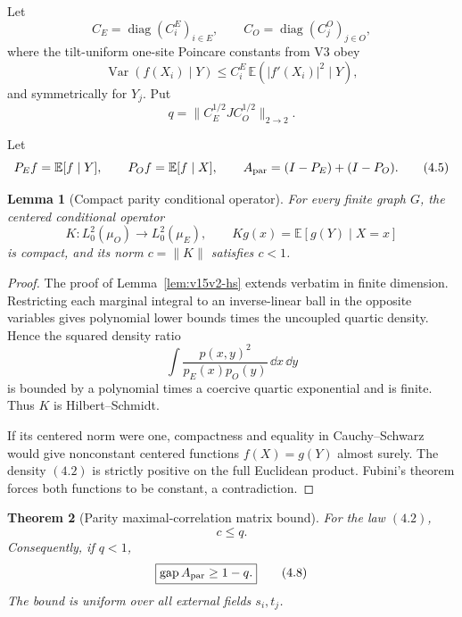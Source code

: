 \documentclass[11pt]{article}
\newtheorem{theorem}{Theorem}[section]
\newtheorem{lemma}[theorem]{Lemma}
\theoremstyle{remark}
\begin{document}
Let
\[
 C_E=\operatorname{diag}(C_i^E)_{i\in E},\qquad
 C_O=\operatorname{diag}(C_j^O)_{j\in O},                    \tag{4.3}
\]
where the tilt-uniform one-site Poincare constants from V3 obey
\[
 \operatorname{Var}(f(X_i)\mid Y)
 \le C_i^E\,\mathbb E(|f'(X_i)|^2\mid Y),
\]
and symmetrically for \(Y_j\).  Put
\[
 q=\|C_E^{1/2}JC_O^{1/2}\|_{2\to2}.                          \tag{4.4}
\]

Let
\[
 P_Ef=\mathbb E[f\mid Y],\qquad
 P_Of=\mathbb E[f\mid X],\qquad
 A_{\rm par}=(I-P_E)+(I-P_O).                                \tag{4.5}
\]

\begin{lemma}[Compact parity conditional operator]
\label{lem:v15v4-compact}
For every finite graph \(G\), the centered conditional operator
\[
 K:L^2_0(\mu_O)\longrightarrow L^2_0(\mu_E),
 \qquad
 Kg(x)=\mathbb E[g(Y)\mid X=x]
\]
is compact, and its norm \(c=\|K\|\) satisfies \(c<1\).
\end{lemma}

\begin{proof}
The proof of Lemma~\ref{lem:v15v2-hs} extends verbatim in finite
dimension.  Restricting each marginal integral to an inverse-linear
ball in the opposite variables gives polynomial lower bounds times
the uncoupled quartic density.  Hence the squared density ratio
\[
 \int
 \frac{p(x,y)^2}{p_E(x)p_O(y)}\,\dd x\,\dd y                 \tag{4.6}
\]
is bounded by a polynomial times a coercive quartic exponential
and is finite.  Thus \(K\) is Hilbert--Schmidt.

If its centered norm were one, compactness and equality in
Cauchy--Schwarz would give nonconstant centered functions
\(f(X)=g(Y)\) almost surely.  The density \((4.2)\) is strictly
positive on the full Euclidean product.  Fubini's theorem forces
both functions to be constant, a contradiction.
\end{proof}

\begin{theorem}[Parity maximal-correlation matrix bound]
\label{thm:v15v4-parity-correlation}
For the law \((4.2)\),
\[
 \boxed{c\le q.}                                             \tag{4.7}
\]
Consequently, if \(q<1\),
\[
 \boxed{\operatorname{gap}A_{\rm par}\ge1-q.}                \tag{4.8}
\]
The bound is uniform over all external fields \(s_i,t_j\).
\end{theorem}
\end{document}
